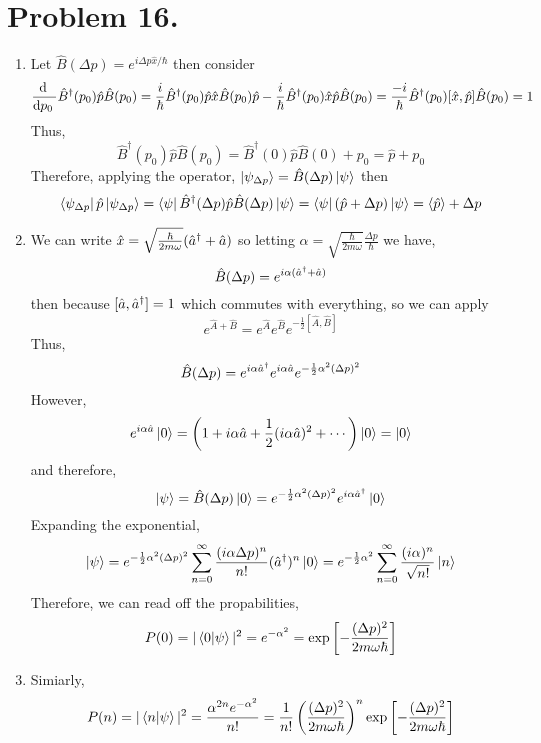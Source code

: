 \documentclass[12pt]{extarticle}
\begin{document}
 
\section*{Problem 16.}

\begin{enumerate}
\item Let $\hat{B}(\Delta p) = e^{i \Delta p \hat{x} /\hbar}$ then consider \[\frac{\mathrm{d} \:}{\mathrm{d}p_0 \:} \hat{B}^\dagger(p_0) \hat{p} \hat{B}(p_0) =  \frac{i}{\hbar} \hat{B}^\dagger(p_0) \hat{p}  \hat{x} \hat{B}(p_0) \hat{p} -  \frac{i}{\hbar} \hat{B}^\dagger(p_0) \hat{x} \hat{p} \hat{B}(p_0)  =  \frac{-i}{\hbar} \hat{B}^\dagger(p_0)[\hat{x}, \hat{p}] \hat{B}(p_0) = 1 \]
Thus, \[ \hat{B}^\dagger(p_0) \hat{p} \hat{B}(p_0) = \hat{B}^\dagger(0) \hat{p} \hat{B}(0) + p_0 = \hat{p} + p_0\]
Therefore, applying the operator, $\left| \psi_{\Delta p} \right> = \hat{B}(\Delta p) \left| \psi \right>$
then \[\left< \psi_{\Delta p} \right| \hat{p} \left| \psi_{\Delta p} \right> = \left< \psi \right| \hat{B}^\dagger(\Delta p) \hat{p} \hat{B}(\Delta p) \left| \psi \right> = \left< \psi \right| (\hat{p} + \Delta p)\left| \psi \right> = \left< \hat{p} \right> + \Delta p\]

\item We can write $\hat{x} = \sqrt{\frac{\hbar}{2 m \omega}} (\hat{a}^\dagger + \hat{a})$ so letting $\alpha = \sqrt{\frac{\hbar}{2 m \omega}} \frac{\Delta p}{\hbar}$ we have, \[ \hat{B}(\Delta p) = e^{i \alpha (\hat{a}^\dagger + \hat{a})}\]
then because $[\hat{a}, \hat{a}^\dagger] = 1$ which commutes with everything, so we can apply \[e^{\hat{A} + \hat{B}}  = e^{\hat{A}} e^{\hat{B}} e^{-\frac{1}{2} [\hat{A}, \hat{B}]}\]
Thus, 
\[ \hat{B}(\Delta p) = e^{i \alpha \hat{a}^\dagger} e^{i \alpha \hat{a}} e^{- \frac{1}{2} \alpha^2 (\Delta p)^2}\]
However, \[e^{i \alpha \hat{a} } \left| 0 \right> = \left(1 + i \alpha \hat{a} + \frac{1}{2} (i \alpha \hat{a})^2 + \cdots \right) \left| 0 \right> = \left| 0 \right>\]
and therefore, \[ \left| \psi \right> = \hat{B}(\Delta p) \left| 0 \right> = e^{-\frac{1}{2} \alpha^2 (\Delta p)^2} e^{i  \alpha \hat{a}^\dagger} \left| 0 \right>\]
Expanding the exponential, 
\[ \left| \psi \right> = e^{-\frac{1}{2} \alpha^2 (\Delta p)^2} \sum_{n = 0}^{\infty} \frac{(i \alpha \Delta p)^n}{n!} (\hat{a}^\dagger)^n \left| 0 \right> = e^{-\frac{1}{2} \alpha^2} \sum_{n = 0}^{\infty} \frac{(i \alpha)^n}{\sqrt{n!}} \left| n \right> \]
Therefore, we can read off the propabilities,
\[P(0) = | \left< 0 | \psi \right> |^2 = e^{-\alpha^2}  = \exp{\left[-\frac{(\Delta p)^2 }{2 m \omega \hbar} \right]}\]
\item Simiarly, 
\[P(n) = | \left< n | \psi \right> |^2 = \frac{\alpha^{2n} e^{-\alpha^2}}{n!} = \frac{1}{n!} \left(\frac{(\Delta p)^2}{2 m \omega \hbar} \right)^n \exp{\left[-\frac{(\Delta p)^2 }{2 m \omega \hbar} \right]} \]
\end{enumerate}
\end{document}
